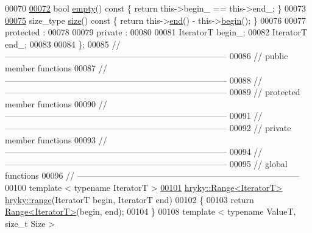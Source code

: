 \begin{DoxyCode}
00070 
\hypertarget{range_8h_source_l00072}{}\hyperlink{classhryky_1_1_range_a4a5a9552aa2ddadbac3904bd90fa3ea8}{00072}     \textcolor{keywordtype}{bool} \hyperlink{classhryky_1_1_range_a4a5a9552aa2ddadbac3904bd90fa3ea8}{empty}()\textcolor{keyword}{ const }\{ \textcolor{keywordflow}{return} this->begin\_ == this->end\_; \}
00073 
\hypertarget{range_8h_source_l00075}{}\hyperlink{classhryky_1_1_range_a38820cf89240d336b89648f5ec9948ad}{00075}     size\_type \hyperlink{classhryky_1_1_range_a38820cf89240d336b89648f5ec9948ad}{size}()\textcolor{keyword}{ const }\{ \textcolor{keywordflow}{return} this->\hyperlink{classhryky_1_1_range_a202ec210efd7e9cb9a22b2e98ab21107}{end}() - this->\hyperlink{classhryky_1_1_range_aaa45d0481e79fb4d22ec8f048fa23086}{begin}(); \}
00076 
00077 \textcolor{keyword}{protected} :
00078 
00079 \textcolor{keyword}{private} :
00080 
00081     IteratorT   begin\_;
00082     IteratorT   end\_;
00083 
00084 \};
00085 \textcolor{comment}{//
      ------------------------------------------------------------------------------}
00086 \textcolor{comment}{// public member functions}
00087 \textcolor{comment}{//
      ------------------------------------------------------------------------------}
00088 \textcolor{comment}{//
      ------------------------------------------------------------------------------}
00089 \textcolor{comment}{// protected member functions}
00090 \textcolor{comment}{//
      ------------------------------------------------------------------------------}
00091 \textcolor{comment}{//
      ------------------------------------------------------------------------------}
00092 \textcolor{comment}{// private member functions}
00093 \textcolor{comment}{//
      ------------------------------------------------------------------------------}
00094 \textcolor{comment}{//
      ------------------------------------------------------------------------------}
00095 \textcolor{comment}{// global functions}
00096 \textcolor{comment}{//
      ------------------------------------------------------------------------------}
00100 \textcolor{comment}{}\textcolor{keyword}{template} < \textcolor{keyword}{typename} IteratorT >
\hypertarget{range_8h_source_l00101}{}\hyperlink{namespacehryky_a6093192359bc9630d58d6158bd0178f4}{00101} \hyperlink{classhryky_1_1_range}{hryky::Range<IteratorT>} \hyperlink{namespacehryky_a6093192359bc9630d58d6158bd0178f4}{hryky::range}(IteratorT begin, IteratorT end)
00102 \{
00103     \textcolor{keywordflow}{return} \hyperlink{classhryky_1_1_range}{Range<IteratorT>}(begin, end);
00104 \}
00108 \textcolor{keyword}{template} < \textcolor{keyword}{typename} ValueT, \textcolor{keywordtype}{size\_t} Size >

\end{DoxyCode}
